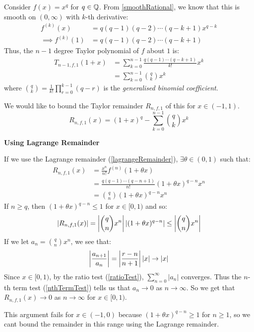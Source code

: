 \documentclass[../main.tex]{subfiles}
\begin{document}
\begin{example}
  Consider $f(x) = x^{q}$ for $q \in \mathbb{Q}$.
  From \cref{smoothRational}, we know that this is smooth on $(0, \infty)$ with $k$-th derivative:
  \begin{align*}
    f^{(k)}(x) &= q(q - 1)(q - 2) \cdots (q - k + 1) x^{q - k} \\
    \implies f^{(k)}(1) &= q(q - 1)(q - 2) \cdots (q - k + 1)
  \end{align*}
  Thus, the $n - 1$ degree Taylor polynomial of $f$ about $1$ is:
  \begin{align*}
    T_{n - 1, f, 1}(1 + x) &= \sum_{k = 0}^{n - 1} \frac{q(q - 1) \cdots (q - k + 1)}{k!} x^{k} \\
                           &= \sum_{k = 0}^{n - 1} \binom{q}{k} x^{k}
  \end{align*}
  where $\binom{q}{k} = \frac{1}{k!} \prod_{r = 0}^{k - 1} (q - r)$ is the \textit{generalised binomial coefficient}.

  We would like to bound the Taylor remainder $R_{n, f, 1}$ of this for $x \in (-1, 1)$.
  \[
    R_{n, f, 1}(x) = (1 + x)^{q} - \sum_{k = 0}^{n - 1} \binom{q}{k}x^{k}
  \]

  \textbf{Using Lagrange Remainder}\par
  If we use the Lagrange remainder (\cref{lagrangeRemainder}), $\exists \theta \in (0, 1)$ such that:
  \begin{align*}
    R_{n, f, 1}(x) &= \frac{x^{n}}{n!}f^{(n)}(1 + \theta x) \\
                   &= \frac{q(q - 1) \cdots (q - n + 1)}{n!} (1 + \theta x)^{q - n} x^{n} \\
                   &= \binom{q}{n} (1 + \theta x)^{q - n} x^{n}
  \end{align*}
  If $n \geq q$, then $(1 + \theta x)^{q - n} \leq 1$ for $x \in [0, 1)$ and so:
  \[
    |R_{n, f, 1}(x)| = \left\lvert \binom{q}{n}x^{n} \right\rvert|(1 + \theta x)^{q-n}| \leq \left\lvert \binom{q}{n}x^{n} \right\rvert
  \]
  If we let $a_n = \binom{q}{n}x^{n}$, we see that:
  \[
    \left\lvert \frac{a_{n + 1}}{a_{n}} \right\rvert = \left\lvert \frac{r - n}{n + 1} \right\rvert|x| \to |x|
  \]
  Since $x \in [0, 1)$, by the ratio test (\cref{ratioTest}), $\sum_{n = 0}^{\infty} |a_n|$ converges.
  Thus the $n$-th term test (\cref{nthTermTest}) tells us that $a_n \to 0$ as $n \to \infty$.
  So we get that $R_{n, f, 1}(x) \to 0$ as $n \to \infty$ for $x \in [0, 1)$.

  This argument fails for $x \in (-1, 0)$ because $(1 + \theta x)^{q - n} \geq 1$ for $n \geq 1$, so we cant bound the remainder in this range using the Lagrange remainder.


\end{example}
\end{document}

